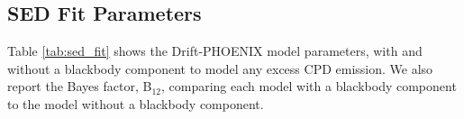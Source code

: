 \documentclass[11pt,twocolumn,twocolappendix]{aastex631}
\begin{document}

\subsection{SED Fit Parameters}
\label{sec:appsedfit}
Table \ref{tab:sed_fit} shows the Drift-PHOENIX model parameters, with and without a blackbody component to model any excess CPD emission. We also report the Bayes factor, B$_{12}$, comparing each model with a blackbody component to the model without a blackbody component.


\end{document}
